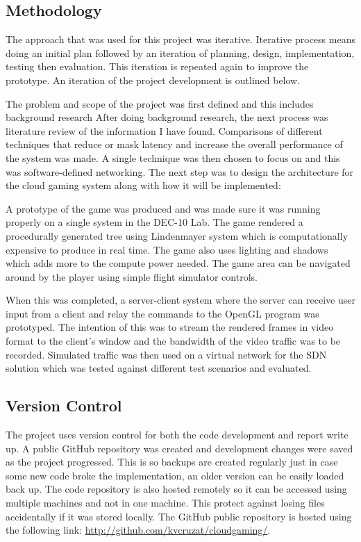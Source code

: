 \subsection{Methodology}
The approach that was used for this project was iterative. Iterative process means doing an initial plan followed by an iteration of planning, design, implementation, testing then evaluation. This iteration is repeated again to improve the prototype. An iteration of the project development is outlined below.
\newline
\par
The problem and scope of the project was first defined and this includes background research After doing background research, the next process was literature review of the information I have found. Comparisons of different techniques that reduce or mask latency and increase the overall performance of the system was made. A single technique was then chosen to focus on and this was software-defined networking. The next step was to design the architecture for the cloud gaming system along with how it will be implemented:
\newline
\par
A prototype of the game was produced and was made sure it was running properly on a single system in the DEC-10 Lab. The game rendered a procedurally generated tree using Lindenmayer system which is computationally expensive to produce in real time. The game also uses lighting and shadows which adds more to the compute power needed. The game area can be navigated around by the player using simple flight simulator controls.
\newline
\par
When this was completed, a server-client system where the server can receive user input from a client and relay the commands to the OpenGL program was prototyped. The intention of this was to stream the rendered frames in video format to the client's window and the bandwidth of the video traffic was to be recorded. Simulated traffic was then used on a virtual network for the SDN solution which was tested against different test scenarios and evaluated.

\subsection{Version Control}
The project uses version control for both the code development and report write up. A public GitHub repository was created and development changes were saved as the project progressed. This is so backups are created regularly just in case some new code broke the implementation, an older version can be easily loaded back up. The code repository is also hosted remotely so it can be accessed using multiple machines and not in one machine. This protect against losing files accidentally if it was stored locally. The GitHub public repository is hosted using the following link:
\url{http://github.com/kvcruzat/cloudgaming/}.